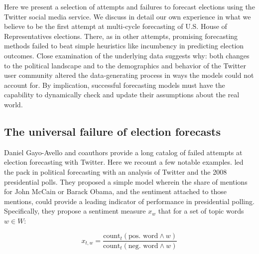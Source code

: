 \documentclass{article}
\begin{document}
Here we present a selection of attempts and failures to forecast
elections using the Twitter social media service. We discuss in detail
our own experience in what we believe to be the first attempt at
multi-cycle forecasting of U.S. House of Representatives
elections. There, as in other attempts, promising forecasting methods
failed to beat simple heuristics like incumbency in predicting
election outcomes. Close examination of the underlying data suggests
why: both changes to the political landscape and to the demographics
and behavior of the Twitter user community altered the data-generating
process in ways the models could not account for. By implication,
successful forecasting models must have the capability to dynamically
check and update their assumptions about the real world. 





\subsection{The universal failure of election forecasts}
\label{sec:univ-fail-elect}

Daniel Gayo-Avello and coauthors \citep{gayo2011limits,metaxas2011not}
provide a long catalog of failed attempts at election forecasting with
Twitter. Here we recount a few notable examples. \cite{o2010tweets}
led the pack in political forecasting with an analysis of Twitter and
the 2008 presidential polls. They proposed a simple model wherein the
share of mentions for John McCain or Barack Obama, and the sentiment
attached to those mentions, could provide a leading indicator of
performance in presidential polling. Specifically, they propose a
sentiment measure $x_w$ that for a set of topic words $w \in W$:

\begin{equation}
  \label{eq:2}
  x_{t,w} = \frac{\textrm{count}_t(\textrm{pos. word} \wedge w)}{\textrm{count}_t(\textrm{neg. word} \wedge w)}
\end{equation}
\end{document}
